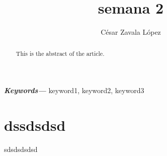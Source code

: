 \documentclass{article}
\date{}
\title{semana 2}
\author[1,*]{César Zavala López \orcidlink{0000-1111-1111-2222}}
\affil[1]{Universidad Politécnica de victoria}
\providecommand{\keywords}[1]
{
  \small  
  \textbf{\textit{Keywords---}} #1
}
\begin{document}
\maketitle
\begin{abstract}
This is the abstract of the article.
\end{abstract}
\keywords{keyword1, keyword2, keyword3}
\section{dssdsdsd}
sdsdsdsdsd
\end{document}
